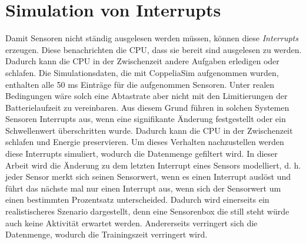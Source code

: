 \section{Simulation von Interrupts}
Damit Sensoren nicht ständig ausgelesen werden müssen, können diese \textit{Interrupts} erzeugen.
Diese benachrichten die CPU, dass sie bereit sind ausgelesen zu werden.
Dadurch kann die CPU in der Zwischenzeit andere Aufgaben erledigen oder schlafen.
\newline
\newline
Die Simulationsdaten, die mit CoppeliaSim aufgenommen wurden, enthalten alle 50 ms Einträge für die aufgenommen Sensoren.
Unter realen Bedingungen wäre solch eine Abtastrate aber nicht mit den Limitierungen der Batterielaufzeit zu vereinbaren.
Aus diesem Grund führen in solchen Systemen Sensoren Interrupts aus, wenn eine signifikante Änderung festgestellt oder ein Schwellenwert überschritten wurde.
Dadurch kann die CPU in der Zwischenzeit schlafen und Energie preservieren.
\newline
\newline
Um dieses Verhalten nachzustellen werden diese Interrupts simuliert, wodurch die Datenmenge gefiltert wird.
In dieser Arbeit wird die Änderung zu dem letzten Interrupt eines Sensors modelliert,
d. h. jeder Sensor merkt sich seinen Sensorwert, wenn es einen Interrupt auslöst
und führt das nächste mal nur einen Interrupt aus, wenn sich der Sensorwert um einen bestimmten Prozentsatz unterscheided.
Dadurch wird einerseits ein realistischeres Szenario dargestellt,
denn eine Sensorenbox die still steht würde auch keine Aktivität erwartet werden.
Andererseits verringert sich die Datenmenge, wodurch die Trainingszeit verringert wird.

\iffalse
\newline
\newline
Allerdings hat sich gezeigt, dass manche Standorte deutlich unterrepräsentiert sind in der Trainingsmenge.
Aus diesem Grund wurde zusätzlich für die Trainingsmenge eine Mindestabtastrate von 4 Hertz eingeführt,
falls in diesem Zeitraum kein Interrupt für diesen Standort stattgefunden hat.
\fi